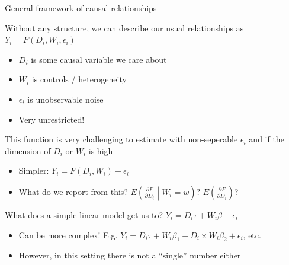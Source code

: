 \documentclass[notes,11pt, aspectratio=169]{beamer}
\newenvironment{wideitemize}{\itemize\addtolength{\itemsep}{10pt}}{\enditemize}
\begin{document}
\begin{frame}{General framework of causal relationships}
  \begin{wideitemize}
  \item Without any structure, we can describe our usual relationships
    as $Y_{i} = F(D_{i}, W_{i},\epsilon_{i})$
    \begin{itemize}
    \item $D_{i}$ is some causal variable we care about
    \item $W_{i}$ is controls / heterogeneity
    \item $\epsilon_{i}$ is unobservable noise
    \item Very unrestricted!
    \end{itemize}
  \item This function is very challenging to estimate with
    non-seperable $\epsilon_{i}$ and if the dimension of $D_{i}$ or
    $W_{i}$ is high
    \begin{itemize}
    \item Simpler: $Y_{i} = F(D_{i}, W_{i}) + \epsilon_{i}$
    \item What do we report from this? $E\left(\frac{\partial{F}}{\partial D_{i}} \middle| W_{i} = w\right)?$ $E\left(\frac{\partial{F}}{\partial D_{i}} \right)$?
    \end{itemize}
  \item What does a simple linear model get us to? $Y_{i} = D_{i}\tau + W_{i}\beta + \epsilon_{i}$
    \begin{itemize}
    \item Can be more complex! E.g.
      $Y_{i} = D_{i}\tau + W_{i}\beta_{1} + D_{i} \times
      W_{i}\beta_{2} + \epsilon_{i}$, etc.
    \item However, in this setting there is not a ``single'' number
      either
    \end{itemize}
  \end{wideitemize}
\end{frame}
\end{document}
